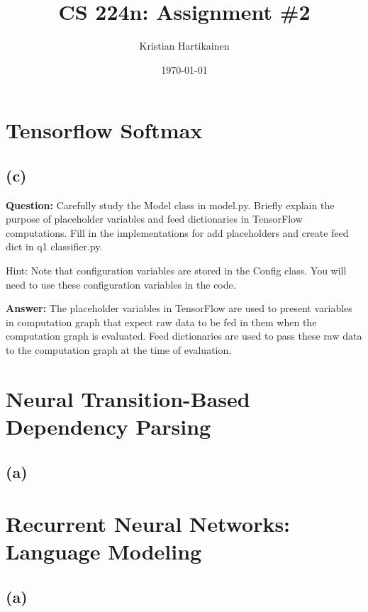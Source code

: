\documentclass[11pt]{article}
\title{ CS 224n: Assignment \#2 }
\author{Kristian Hartikainen}
\date{\today}
\begin{document}
\maketitle

\section{Tensorflow Softmax}
\subsection*{(c)}
\textbf{Question:} Carefully study the Model class in model.py. Briefly explain the purpose
of placeholder variables and feed dictionaries in TensorFlow computations. Fill in the implementations for add placeholders and create feed dict in q1 classifier.py.

Hint: Note that configuration variables are stored in the Config class. You will need to use these configuration variables in the code.

\textbf{Answer:} The placeholder variables in TensorFlow are used to present variables in computation graph that expect raw data to be fed in them when the computation graph is evaluated. Feed dictionaries are used to pass these raw data to the computation graph at the time of evaluation.

\section{Neural Transition-Based Dependency Parsing}
\subsection*{(a)}

\section{Recurrent Neural Networks: Language Modeling}
\subsection*{(a)}
\end{document}
